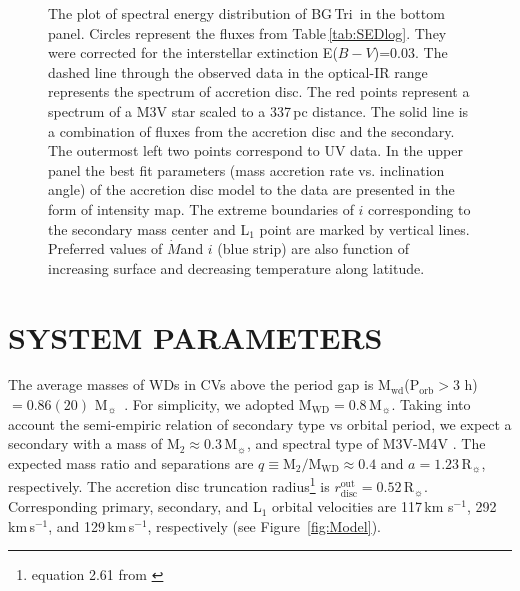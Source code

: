 \documentclass[fleqn,usenatbib]{mnras}
\def\msun{M$_{\odot}$}
\def\bg{BG\,Tri}
\def\msun{M$_{\sun}$}
\def\mdot{$\dot M$}
\begin{document}
\begin{figure}
\setlength{\unitlength}{1mm}
\caption{
 The plot of spectral energy distribution of \bg\ in the bottom panel. Circles represent the fluxes from 
 Table\,\ref{tab:SEDlog}. They were corrected for the interstellar extinction E($B-V$)=0.03.
 The dashed line through the observed data in the optical-IR range  represents the spectrum of accretion disc.   
 The red points represent a spectrum of a M3V star scaled to  a 337\,pc distance.
 The solid line is a combination of fluxes from the accretion disc and the secondary. The outermost left two points correspond to UV data. 
 In the upper panel the best fit parameters (mass accretion rate vs. inclination angle) of the accretion disc model to the data are presented
 in the form of intensity map. The extreme boundaries of $i$ corresponding to the secondary mass center and L$_1$ point are marked by
 vertical lines. Preferred values of \mdot and $i$ (blue strip) are also function of increasing surface and decreasing temperature along
 latitude. }
\label{fig:sed}
\end{figure}




\section{SYSTEM PARAMETERS}
\label{systempar}

The average masses of WDs in CVs   above the period gap is M$_{\mathrm{wd}}$(P$_{\mathrm{orb}} > 3$ h) $= 0.86(20)$ \msun\
\citep{2011A&A...536A..42Z}.
For simplicity, we adopted  M$_{\mathrm{WD}}=0.8$\,\msun. Taking into account the semi-empiric relation of secondary type vs orbital period, we
expect a secondary with a mass of M$_2\approx 0.3$\,M$_{\sun}$, and spectral type of M3V-M4V \citep{2006MNRAS.373..484K}. The expected mass ratio
and separations are $q \equiv {\mathrm{M}}_2/{\mathrm{M}}_{\mathrm{WD}}\approx0.4$ and $a=1.23$\,R$_{\sun}$, respectively. The  accretion disc
truncation radius\footnote{equation 2.61 from \citet{1995CAS....28.....W}} is $r_{\mathrm{disc}}^{\mathrm{out}} = 0.52$\,R$_{\sun}$.
Corresponding primary, secondary, and L$_1$ orbital velocities are 117\,km s$^{-1}$,  292\,km\,s$^{-1}$, and  129\,km\,s$^{-1}$, respectively (see
Figure~\ref{fig:Model}).
%
\end{document}
